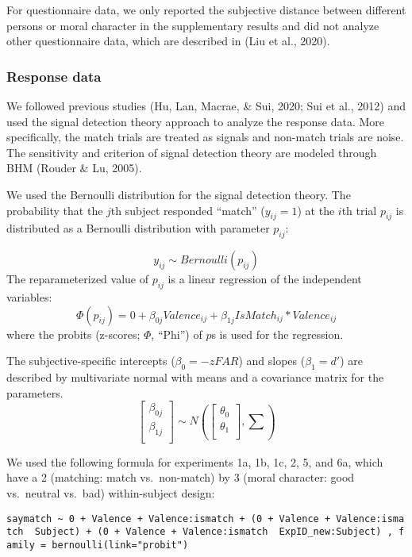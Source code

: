 \documentclass[
  man]{apa6}
\begin{document}
For questionnaire data, we only reported the subjective distance between different persons or moral character in the supplementary results and did not analyze other questionnaire data, which are described in (Liu et al., 2020).

\hypertarget{response-data}{%
\subsubsection{Response data}\label{response-data}}

We followed previous studies (Hu, Lan, Macrae, \& Sui, 2020; Sui et al., 2012) and used the signal detection theory approach to analyze the response data. More specifically, the match trials are treated as signals and non-match trials are noise. The sensitivity and criterion of signal detection theory are modeled through BHM (Rouder \& Lu, 2005).

We used the Bernoulli distribution for the signal detection theory. The probability that the \(j\)th subject responded ``match'' (\(y_{ij} = 1\)) at the \(i\)th trial \(p_{ij}\) is distributed as a Bernoulli distribution with parameter \(p_{ij}\):

\[ y_{ij} \sim Bernoulli(p_{ij})\]
The reparameterized value of \(p_{ij}\) is a linear regression of the independent variables:
\[ \Phi(p_{ij}) = 0 + \beta_{0j}Valence_{ij} + \beta_{1j}IsMatch_{ij} * Valence_{ij}\]
where the probits (z-scores; \(\Phi\), ``Phi'') of \(p\)s is used for the regression.

The subjective-specific intercepts (\(\beta_{0} = -zFAR\)) and slopes (\(\beta_{1} = d'\)) are described by multivariate normal with means and a covariance matrix for the parameters.
\[ \begin{bmatrix}\beta_{0j}\\
\beta_{1j}\\
\end{bmatrix} \sim N(\begin{bmatrix}\theta_{0}\\
\theta_{1}\\
\end{bmatrix}, \sum) \]

We used the following formula for experiments 1a, 1b, 1c, 2, 5, and 6a, which have a 2 (matching: match vs.~non-match) by 3 (moral character: good vs.~neutral vs.~bad) within-subject design:

\texttt{saymatch\ \textasciitilde{}\ 0\ +\ Valence\ +\ Valence:ismatch\ +\ (0\ +\ Valence\ +\ Valence:ismatch\ \textbar{}\ Subject)\ +\ (0\ +\ Valence\ +\ Valence:ismatch\ \textbar{}\ ExpID\_new:Subject)\ ,\ family\ =\ bernoulli(link="probit")}
\end{document}
